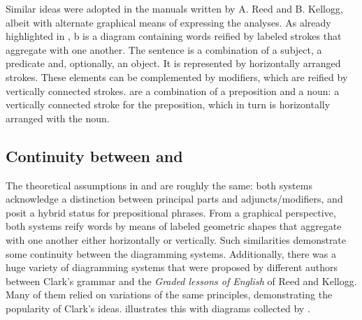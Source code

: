 \documentclass[english,output=paper,colorlinks,citecolor=brown]{../langscibook}
\begin{document}
Similar ideas were adopted in the manuals written by A. Reed and B. Kellogg, albeit with alternate graphical means of expressing the analyses. As already highlighted in , b is a diagram containing words reified by labeled strokes that aggregate with one another. The sentence is a combination of a subject, a predicate and, optionally, an object. It is represented by horizontally arranged strokes. These elements can be complemented by modifiers, which are reified by vertically connected strokes.  are a combination of a preposition and a noun: a vertically connected stroke for the preposition, which in turn is horizontally arranged with the noun. 

\subsection{Continuity between \citet{Clark1847} and \citet{ReedBrainerd1879}}\label{sec:4:3.2}

The theoretical assumptions in \citet{Clark1847} and \citet{ReedBrainerd1879} are roughly the same: both systems acknowledge a distinction between principal parts and adjuncts/modifiers, and posit a hybrid status for prepositional phrases. From a graphical perspective, both systems reify words by means of labeled geometric shapes that aggregate with one another either horizontally or vertically. Such similarities demonstrate some continuity between the diagramming systems. Additionally, there was a huge variety of diagramming systems that were proposed by different authors between Clark’s grammar and the \textit{Graded lessons of English} of Reed and Kellogg. Many of them relied on variations of the same principles, demonstrating the popularity of Clark’s ideas.  illustrates this with diagrams collected by \citet{Brittain1973}.
\end{document}
